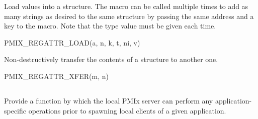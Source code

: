 Load values into a  structure. The macro can be called multiple times to add as many strings as desired to the same structure by passing the same address and a  key to the macro. Note that the  type value must be given each time.

\cspecificstart
\begin{codepar}
PMIX_REGATTR_LOAD(a, n, k, t, ni, v)
\end{codepar}
\cspecificend

\begin{arglist}
\end{arglist}


Non-destructively transfer the contents of a  structure to another one.

\cspecificstart
\begin{codepar}
PMIX_REGATTR_XFER(m, n)
\end{codepar}
\cspecificend

\begin{arglist}
\end{arglist}


\subsection{}

\summary

Provide a function by which the local \ac{PMIx} server can perform any application-specific operations prior to spawning local clients of a given application.

\format

